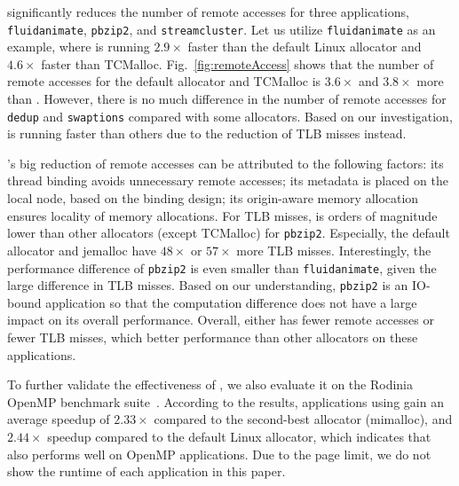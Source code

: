 \NM{} significantly reduces the number of remote accesses for three applications, \texttt{fluidanimate}, \texttt{pbzip2}, and \texttt{streamcluster}. Let us utilize \texttt{fluidanimate} as an example, where \NM{} is running $2.9\times$ faster than the default Linux allocator and $4.6\times$ faster than TCMalloc. Fig.~\ref{fig:remoteAccess} shows that the number of remote accesses for the default allocator and TCMalloc is $3.6\times$ and $3.8\times$ more than \NM{}. However, there is no much difference in the number of remote accesses for \texttt{dedup} and \texttt{swaptions} compared with some allocators. Based on our investigation, \NM{} is running faster than others due to the reduction of TLB misses instead. 

\NM{}'s big reduction of remote accesses can be attributed to the following factors: its thread binding avoids unnecessary remote accesses; its metadata is placed on the local node, based on the binding design; its origin-aware memory allocation ensures locality of memory allocations.
For TLB misses, \NM{} is orders of magnitude lower than other allocators (except TCMalloc) for \texttt{pbzip2}. Especially, the default allocator and jemalloc have $48\times$ or $57\times$ more TLB misses. Interestingly, the performance difference of \texttt{pbzip2} is even smaller than \texttt{fluidanimate}, given the large difference in TLB misses. Based on our understanding, \texttt{pbzip2} is an IO-bound application so that the computation difference does not have a large impact on its overall performance. 
Overall, \NM{} either has fewer remote accesses or fewer TLB misses, which  better performance than other allocators on these applications. 



To further validate the effectiveness of \NM{}, we also evaluate it on the Rodinia OpenMP benchmark suite~\cite{che2009rodinia}. According to the results, applications using \NM{} gain an average speedup of $2.33\times$ compared to the second-best allocator (mimalloc), and $2.44\times$ speedup compared to the default Linux allocator, which indicates that \NM{} also performs well on OpenMP applications. Due to the page limit, we do not show the runtime of each application in this paper. 

